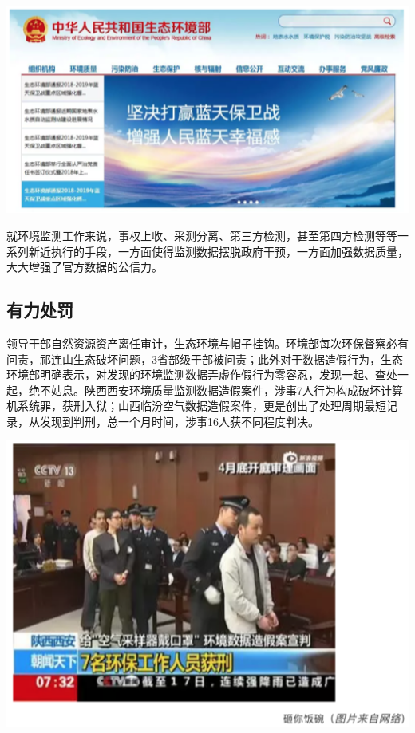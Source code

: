 \documentclass[]{book}
\begin{document}
\includegraphics[width=6.67in]{images/fw3}

就环境监测工作来说，事权上收、采测分离、第三方检测，甚至第四方检测等等一系列新近执行的手段，一方面使得监测数据摆脱政府干预，一方面加强数据质量，大大增强了官方数据的公信力。

\hypertarget{ux6709ux529bux5904ux7f5a}{%
\subsection{有力处罚}\label{ux6709ux529bux5904ux7f5a}}

领导干部自然资源资产离任审计，生态环境与帽子挂钩。环境部每次环保督察必有问责，祁连山生态破坏问题，3省部级干部被问责；此外对于数据造假行为，生态环境部明确表示，对发现的环境监测数据弄虚作假行为零容忍，发现一起、查处一起，绝不姑息。陕西西安环境质量监测数据造假案件，涉事7人行为构成破坏计算机系统罪，获刑入狱；山西临汾空气数据造假案件，更是创出了处理周期最短记录，从发现到判刑，总一个月时间，涉事16人获不同程度判决。

\includegraphics[width=6.67in]{images/fw4}
\end{document}
